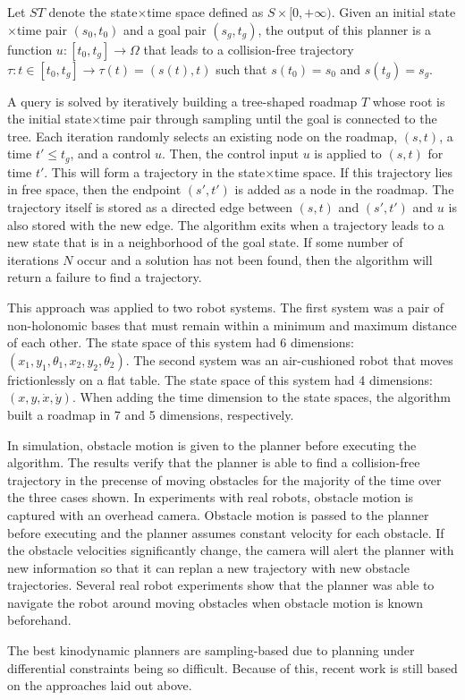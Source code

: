 Let $ST$ denote the state$\times$time space defined as $S\times[0,+\infty)$. Given an initial state$\times$time pair $(s_0, t_0)$ and a goal pair $(s_g, t_g)$, the output of this planner is a function $u:[t_0, t_g] \rightarrow \Omega$ that leads to a collision-free trajectory $\tau: t \in [t_0, t_g] \rightarrow \tau(t) = (s(t),t)$ such that $s(t_0)=s_0$ and $s(t_g)=s_g$.

A query is solved by iteratively building a tree-shaped roadmap $T$ whose root is the initial state$\times$time pair through sampling until the goal is connected to the tree. Each iteration randomly selects an existing node on the roadmap, $(s,t)$, a time $t' \leq t_g$, and a control $u$. Then, the control input $u$ is applied to $(s,t)$ for time $t'$. This will form a trajectory in the state$\times$time space. If this trajectory lies in free space, then the endpoint $(s',t')$ is added as a node in the roadmap. The trajectory itself is stored as a directed edge between $(s,t)$ and $(s',t')$ and $u$ is also stored with the new edge. The algorithm exits when a trajectory leads to a new state that is in a neighborhood of the goal state. If some number of iterations $N$ occur and a solution has not been found, then the algorithm will return a failure to find a trajectory.

This approach was applied to two robot systems. The first system was a pair of non-holonomic bases that must remain within a minimum and maximum distance of each other. The state space of this system had 6 dimensions: $(x_1, y_1, \theta_1, x_2, y_2, \theta_2)$. The second system was an air-cushioned robot that moves frictionlessly on a flat table. The state space of this system had 4 dimensions: $(x, y, \dot{x}, \dot{y})$. When adding the time dimension to the state spaces, the algorithm built a roadmap in 7 and 5 dimensions, respectively.

In simulation, obstacle motion is given to the planner before executing the algorithm. The results verify that the planner is able to find a collision-free trajectory in the precense of moving obstacles for the majority of the time over the three cases shown. In experiments with real robots, obstacle motion is captured with an overhead camera. Obstacle motion is passed to the planner before executing and the planner assumes constant velocity for each obstacle. If the obstacle velocities significantly change, the camera will alert the planner with new information so that it can replan a new trajectory with new obstacle trajectories. Several real robot experiments show that the planner was able to navigate the robot around moving obstacles when obstacle motion is known beforehand.

The best kinodynamic planners are sampling-based due to planning under differential constraints being so difficult. Because of this, recent work is still based on the approaches laid out above.